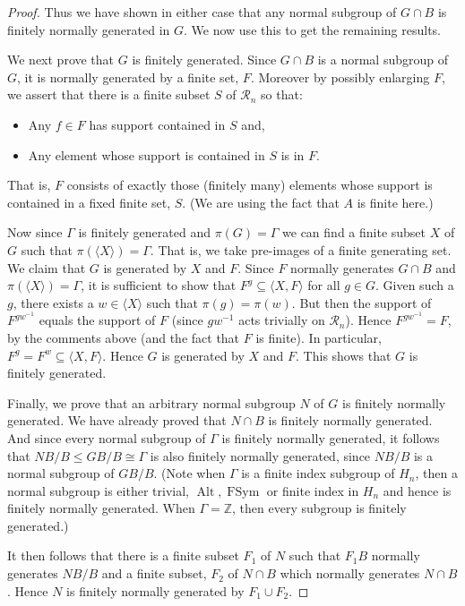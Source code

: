 \documentclass[10pt,a4paper]{amsart}
\newcommand{\Alt}{\operatorname{Alt}}
\newcommand{\FSym}{\operatorname{FSym}}
\newcommand{\Ra}{\mathcal{R}}
\newcommand{\Z}{\mathbb Z}
\begin{document}
\begin{proof}
\medspace

Thus we have shown in either case that any normal subgroup of $G \cap B$ is finitely normally generated in $G$. We now use this to get the remaining results. 


\medspace

We next prove that $G$ is finitely generated. Since $G \cap B$ is a normal subgroup of $G$, it is normally generated by a finite set, $F$. Moreover by possibly enlarging $F$, we assert that there is a finite subset $S$ of $\Ra_n$ so that:
\begin{itemize}
	\item Any $f \in F$ has support contained in $S$ and, 
	\item Any element whose support is contained in $S$ is in $F$. 
\end{itemize}
That is, $F$ consists of exactly those (finitely many) elements whose support is contained in a fixed finite set, $S$. (We are using the fact that $A$ is finite here.)

Now since $\Gamma$ is finitely generated and $\pi(G)= \Gamma$ we can find a finite subset $X$ of $G$ such that $\pi(\langle X \rangle) = \Gamma$. That is, we take pre-images of a finite generating set. We claim that $G$ is generated by $X$ and $F$. Since $F$ normally generates $G \cap B$ and $\pi(\langle X \rangle) = \Gamma$, it is sufficient to show that $F^g \subseteq \langle X, F \rangle$ for all $g \in G$. Given such a $g$, there exists a $w \in \langle X \rangle$ such that $\pi(g)=\pi(w)$. But then the support of $F^{g w^{-1}}$ equals the support of $F$ (since $g w^{-1}$ acts trivially on $\Ra_n$). Hence $F^{g w^{-1}}  = F$, by the comments above (and the fact that $F$ is finite). In particular, $F^g = F^w \subseteq \langle X, F \rangle$. Hence $G$ is generated by $X$ and $F$. This shows that $G$ is finitely generated. 

\medspace

Finally, we prove that an arbitrary normal subgroup $N$ of $G$ is finitely normally generated. We have already proved that $N \cap B$ is finitely normally generated. And since every normal subgroup of $\Gamma$ is finitely normally generated, it follows that $NB/B \leq GB/B \cong \Gamma$ is also finitely normally generated, since $NB/B$ is a normal subgroup of $GB/B$. (Note when $\Gamma$ is a finite index subgroup of $H_n$, then a normal subgroup is either trivial, $\Alt, \FSym$ or finite index in $H_n$ and hence is finitely normally generated. When $\Gamma=\Z$, then every subgroup is finitely generated.)

It then follows that there is a finite subset $F_1$ of $N$ such that $F_1B$ normally generates $NB/B$ and a finite subset, $F_2$ of $N \cap B$ which normally generates $N \cap B$. Hence $N$ is finitely normally generated by $F_1 \cup F_2$. 
\end{proof}
\end{document}
